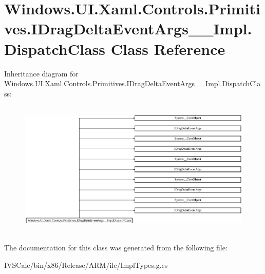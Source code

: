 \hypertarget{class_windows_1_1_u_i_1_1_xaml_1_1_controls_1_1_primitives_1_1_i_drag_delta_event_args_____impl_1_1_dispatch_class}{}\section{Windows.\+U\+I.\+Xaml.\+Controls.\+Primitives.\+I\+Drag\+Delta\+Event\+Args\+\_\+\+\_\+\+Impl.\+Dispatch\+Class Class Reference}
\label{class_windows_1_1_u_i_1_1_xaml_1_1_controls_1_1_primitives_1_1_i_drag_delta_event_args_____impl_1_1_dispatch_class}
Inheritance diagram for Windows.\+U\+I.\+Xaml.\+Controls.\+Primitives.\+I\+Drag\+Delta\+Event\+Args\+\_\+\+\_\+\+Impl.\+Dispatch\+Class\+:\begin{figure}[H]
\begin{center}
\leavevmode
\includegraphics[height=6.567164cm]{class_windows_1_1_u_i_1_1_xaml_1_1_controls_1_1_primitives_1_1_i_drag_delta_event_args_____impl_1_1_dispatch_class}
\end{center}
\end{figure}


The documentation for this class was generated from the following file\+:\begin{DoxyCompactItemize}
\item 
I\+V\+S\+Calc/bin/x86/\+Release/\+A\+R\+M/ilc/Impl\+Types.\+g.\+cs\end{DoxyCompactItemize}
